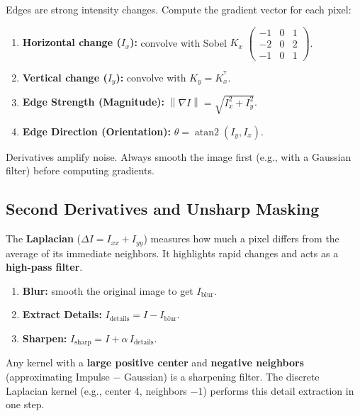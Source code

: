 \documentclass[11pt, oneside]{book}
\newcommand{\norm}[1]{\left\lVert #1 \right\rVert}
\newcommand{\T}{^{\mathsf{T}}}
\begin{document}
\begin{thmbox}[title={Image Gradient (Edge Detection)}]
Edges are strong intensity changes. Compute the gradient vector for each pixel:
\begin{enumerate}
  \item \textbf{Horizontal change ($I_x$):} convolve with Sobel $K_x$ $\left(\begin{smallmatrix}-1&0&1\\-2&0&2\\-1&0&1\end{smallmatrix}\right)$.
  \item \textbf{Vertical change ($I_y$):} convolve with $K_y=K_x^{\T}$.
  \item \textbf{Edge Strength (Magnitude):} $\norm{\nabla I} = \sqrt{I_x^2 + I_y^2}$.
  \item \textbf{Edge Direction (Orientation):} $\theta = \operatorname{atan2}(I_y, I_x)$.
\end{enumerate}
\end{thmbox}

Derivatives amplify noise. Always smooth the image first (e.g., with a Gaussian filter) before computing gradients.

\subsection{Second Derivatives and Unsharp Masking}

\begin{defbox}[title={Laplacian}]
The \textbf{Laplacian} ($\Delta I = I_{xx} + I_{yy}$) measures how much a pixel differs from the average of its
immediate neighbors. It highlights rapid changes and acts as a \textbf{high-pass filter}.
\end{defbox}

\begin{thmbox}[title={Unsharp Masking}]
\begin{enumerate}
  \item \textbf{Blur:} smooth the original image to get $I_{\text{blur}}$.
  \item \textbf{Extract Details:} $I_{\text{details}} = I - I_{\text{blur}}$.
  \item \textbf{Sharpen:} $I_{\text{sharp}} = I + \alpha\,I_{\text{details}}$.
\end{enumerate}
\end{thmbox}

Any kernel with a \textbf{large positive center} and \textbf{negative neighbors} (approximating Impulse $-$ Gaussian)
is a sharpening filter. The discrete Laplacian kernel (e.g., center 4, neighbors $-1$) performs this detail extraction in one step.
\end{document}
